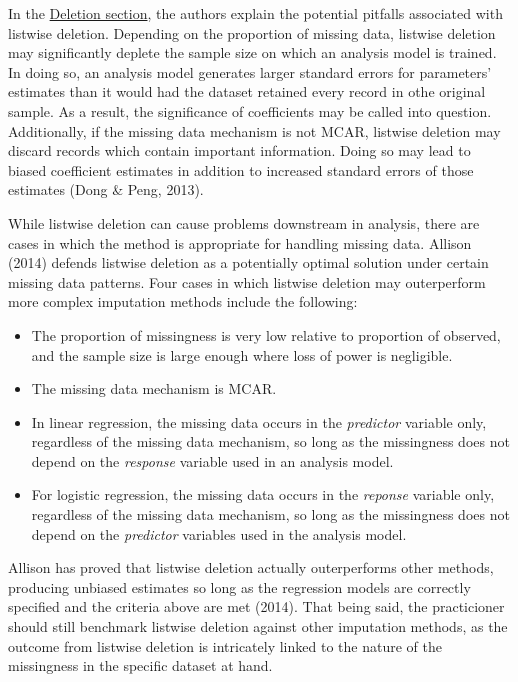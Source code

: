 \documentclass[12pt,oneside]{chicagocapstone}
\providecommand{\tightlist}{%
  \setlength{\itemsep}{0pt}\setlength{\parskip}{0pt}}
\begin{document}
In the \protect\hyperlink{background-deletion}{Deletion section}, the
authors explain the potential pitfalls associated with listwise
deletion. Depending on the proportion of missing data, listwise deletion
may significantly deplete the sample size on which an analysis model is
trained. In doing so, an analysis model generates larger standard errors
for parameters' estimates than it would had the dataset retained every
record in othe original sample. As a result, the significance of
coefficients may be called into question. Additionally, if the missing
data mechanism is not MCAR, listwise deletion may discard records which
contain important information. Doing so may lead to biased coefficient
estimates in addition to increased standard errors of those estimates
(Dong \& Peng, 2013).

While listwise deletion can cause problems downstream in analysis, there
are cases in which the method is appropriate for handling missing data.
Allison (2014) defends listwise deletion as a potentially optimal
solution under certain missing data patterns. Four cases in which
listwise deletion may outerperform more complex imputation methods
include the following:
\begin{itemize}
\tightlist
\item
  The proportion of missingness is very low relative to proportion of
  observed, and the sample size is large enough where loss of power is
  negligible.
\item
  The missing data mechanism is MCAR.
\item
  In linear regression, the missing data occurs in the \emph{predictor}
  variable only, regardless of the missing data mechanism, so long as
  the missingness does not depend on the \emph{response} variable used
  in an analysis model.
\item
  For logistic regression, the missing data occurs in the \emph{reponse}
  variable only, regardless of the missing data mechanism, so long as
  the missingness does not depend on the \emph{predictor} variables used
  in the analysis model.
\end{itemize}
Allison has proved that listwise deletion actually outerperforms other
methods, producing unbiased estimates so long as the regression models
are correctly specified and the criteria above are met (2014). That
being said, the practicioner should still benchmark listwise deletion
against other imputation methods, as the outcome from listwise deletion
is intricately linked to the nature of the missingness in the specific
dataset at hand.
\end{document}
